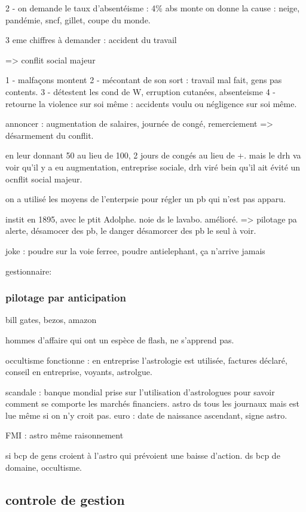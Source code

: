 \documentclass[a4paper,12pt]{article}
\begin{document}
2 - on demande le taux d'absentéisme : 4\%
abs monte on donne la cause : neige, pandémie, sncf, gillet, coupe du monde.

3 eme chiffres à demander : accident du travail

=> conflit social majeur

1 - malfaçons montent
2 - mécontant de son sort : travail mal fait, gens pas contents.
3 - détestent les cond de W, erruption cutanées, absenteisme
4 - retourne la violence sur soi même : accidents voulu ou négligence sur soi même.

annoncer : augmentation de salaires, journée de congé, remerciement => désarmement du conflit.

en leur donnant 50 au lieu de 100, 2 jours de congés au lieu de +.
mais le drh va voir qu'il y a eu augmentation, entreprise sociale, drh viré bein qu'il ait évité
un ocnflit social majeur.

on a utilisé les moyens de l'enterpsie pour régler un pb qui n'est pas apparu.

instit en 1895, avec le ptit Adolphe. noie ds le lavabo. amélioré. 
=> pilotage pa alerte, désamocer des pb, le danger désamorcer des pb 
le seul à voir.  

joke : poudre sur la voie ferree, poudre antielephant, ça n'arrive jamais

gestionnaire:

\subsubsection{pilotage par anticipation}

bill gates,
bezos, amazon

hommes d'affaire qui ont un espèce de flash, ne s'apprend pas.

occultisme fonctionne : en entreprise l'astrologie est utilisée,
factures déclaré, conseil en entreprise, voyants, astrolgue.

scandale : banque mondial prise sur l'utilisation d'astrologues pour savoir comment se comporte
les marchés financiers. astro ds tous les journaux mais est lue même si on n'y croit pas.
euro : date de naissance ascendant, signe astro.

FMI : astro même raisonnement

si bcp de gens croient à l'astro qui prévoient une baisse d'action.
ds bcp de domaine, occultisme.


\subsection{controle de gestion}
\end{document}
